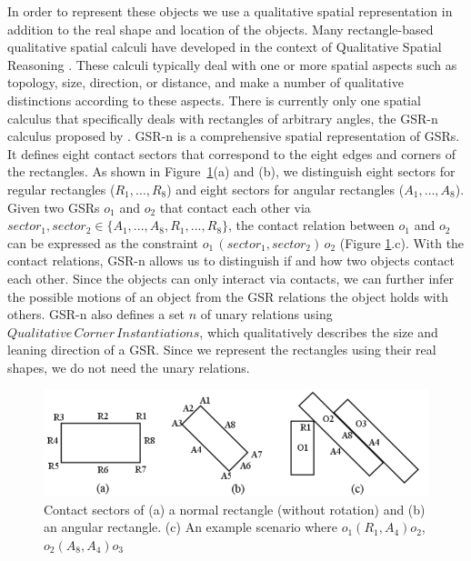 \documentclass[letterpaper]{article}
\begin{document}
In order to represent these objects we use a qualitative spatial representation in addition to the real shape and location of the objects. Many rectangle-based qualitative spatial calculi \cite{balbiani1998model,cohn2012thinking,sokeh2013efficient} have developed in the context of Qualitative Spatial Reasoning \cite{cohn2008qualitative}. These calculi typically deal with one or more spatial aspects such as topology, size, direction, or distance, and make a number of qualitative distinctions according to these aspects. There is currently only one spatial calculus that specifically deals with rectangles of arbitrary angles, the GSR-n calculus proposed by \cite{Ge2013}. GSR-n is a comprehensive spatial representation of GSRs. It defines eight contact sectors that correspond to the eight edges and corners of the rectangles. As shown in Figure~\ref{GSR}(a) and (b), we distinguish eight sectors for regular rectangles ($R_1,\ldots,R_8$) and eight sectors for angular rectangles ($A_1,\ldots,A_8$). Given two GSRs $o_1$ and $o_2$ that contact each other via $sector_1, sector_2 \in \{A_1, ..., A_8, R_1, ..., R_8\}$, the contact relation between $o_1$ and $o_2$ can be expressed as the constraint $o_1 \, (sector_1, sector_2) \, o_2$ (Figure \ref{GSR}.c). With the contact relations, GSR-n allows us to distinguish if and how two objects contact each other. Since the objects can only interact via contacts, we can further infer the possible motions of an object from the GSR relations the object holds with others. GSR-n also defines a set $n$ of unary relations using  $Qualitative\,Corner\,Instantiations$, which qualitatively describes the size and leaning direction of a GSR. Since we represent the rectangles using their real shapes, we do not need the unary relations. 
\begin{figure}[h!]
\centering\includegraphics[scale=0.28]{GSR.png}\caption{Contact sectors of (a) a normal rectangle (without rotation) and (b) an angular rectangle. (c) An example scenario where $o_1 (R_1, A_4) o_2$, $o_2 (A_8, A_4) o_3$}
\label{GSR}
\vspace{-3mm}
\end{figure}
\end{document}

